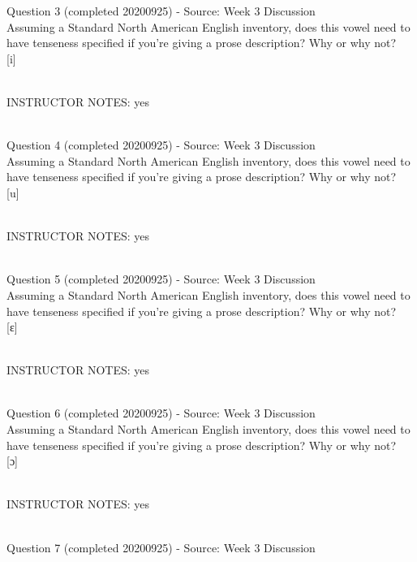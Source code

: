 \documentclass[12pt]{article}
\begin{document}
{\large Question 3} (completed 20200925) - Source: Week 3 Discussion\\

Assuming a Standard North American English inventory, does this vowel need to have tenseness specified if you're giving a prose description? Why or why not?\\

{[i]}


~\\
INSTRUCTOR NOTES: yes


~\\

{\large Question 4} (completed 20200925) - Source: Week 3 Discussion\\

Assuming a Standard North American English inventory, does this vowel need to have tenseness specified if you're giving a prose description? Why or why not?\\

{[u]}


~\\
INSTRUCTOR NOTES: yes


~\\

{\large Question 5} (completed 20200925) - Source: Week 3 Discussion\\

Assuming a Standard North American English inventory, does this vowel need to have tenseness specified if you're giving a prose description? Why or why not?\\

{[ɛ]}


~\\
INSTRUCTOR NOTES: yes


~\\

{\large Question 6} (completed 20200925) - Source: Week 3 Discussion\\

Assuming a Standard North American English inventory, does this vowel need to have tenseness specified if you're giving a prose description? Why or why not?\\

{[ɔ]}


~\\
INSTRUCTOR NOTES: yes


~\\

{\large Question 7} (completed 20200925) - Source: Week 3 Discussion\\
\end{document}

